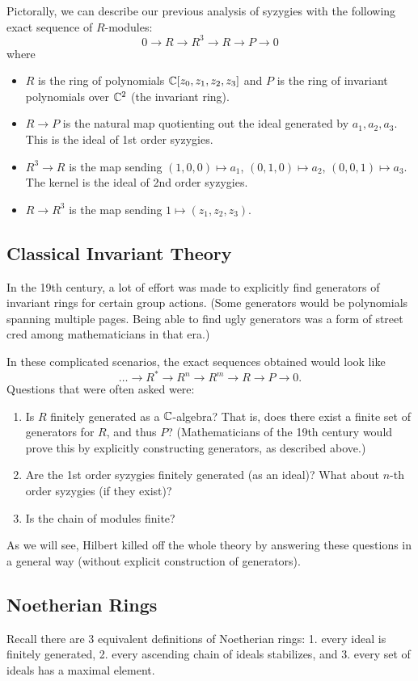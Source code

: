 Pictorally, we can describe our previous analysis of syzygies with the following exact sequence of $R$-modules:
\[
    0 \to R \to R^3 \to R \to P \to 0
\]
where
\begin{itemize}
    \item $R$ is the ring of polynomials ${\mathbb C}[z_0, z_1, z_2, z_3]$ and $P$ is the ring of invariant polynomials over ${\mathbb C}^2$ (the invariant ring).
    \item $R \to P$ is the natural map quotienting out the ideal generated by $a_1, a_2, a_3$. This is the ideal of 1st order syzygies.
    \item $R^3 \to R$ is the map sending $(1,0,0) \mapsto a_1$, $(0,1,0) \mapsto a_2$, $(0,0,1) \mapsto a_3$. The kernel is the ideal of 2nd order syzygies.
    \item $R \to R^3$ is the map sending $1 \mapsto (z_1, z_2, z_3)$.
\end{itemize}

\subsection{Classical Invariant Theory}
In the 19th century, a lot of effort was made to explicitly find generators of invariant rings for certain group actions. (Some generators would be polynomials spanning multiple pages. Being able to find ugly generators was a form of street cred among mathematicians in that era.)

In these complicated scenarios, the exact sequences obtained would look like
\[
    \dots \to R^* \to R^n \to R^m \to R \to P \to 0.
\]
Questions that were often asked were:
\begin{enumerate}
    \item Is $R$ finitely generated as a ${\mathbb C}$-algebra? That is, does there exist a finite set of generators for $R$, and thus $P$? (Mathematicians of the 19th century would prove this by explicitly constructing generators, as described above.)
    \item Are the 1st order syzygies finitely generated (as an ideal)? What about $n$-th order syzygies (if they exist)?
    \item Is the chain of modules finite?
\end{enumerate}
As we will see, Hilbert killed off the whole theory by answering these questions in a general way (without explicit construction of generators).

\subsection{Noetherian Rings}
Recall there are 3 equivalent definitions of Noetherian rings: 1. every ideal is finitely generated, 2. every ascending chain of ideals stabilizes, and 3. every set of ideals has a maximal element.

